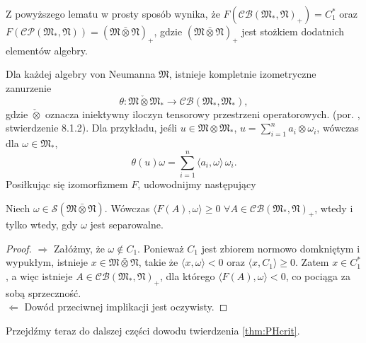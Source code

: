 Z powyższego lematu w prosty sposób wynika, że
$F(\mathcal{CB}(\mathfrak{M}_{*}, \mathfrak{N})_{+}) = C_{1}^{*}$ oraz
$F(\mathcal{CP}(\mathfrak{M}_{*}, \mathfrak{N})) = (\mathfrak{M} \bar{\otimes} \mathfrak{N})_{+}$,
gdzie $(\mathfrak{M} \bar{\otimes} \mathfrak{N})_{+}$
jest stożkiem dodatnich elementów algebry.

Dla każdej algebry von Neumanna $\mathfrak{M}$,
istnieje kompletnie izometryczne zanurzenie
\begin{equation}
\theta: \mathfrak{M} \check{\otimes} \mathfrak{M}_{*}\rightarrow
\mathcal{CB}(\mathfrak{M}_{*}, \mathfrak{M}_{*}),
\end{equation}
gdzie $\check{\otimes}$ oznacza iniektywny iloczyn tensorowy przestrzeni operatorowych.
(por. \cite{Effros2000}, stwierdzenie 8.1.2).
Dla przykładu, jeśli
$u \in \mathfrak{M} \otimes \mathfrak{M}_{*}$, $u = \sum_{i = 1}^{n} a_{i} \otimes \omega_{i}$,
wówczas dla $\omega \in \mathfrak{M}_{*}$,
\begin{equation}
\theta(u)\omega = \sum_{i=1}^{n} \langle a_{i} , \omega \rangle \, \omega_{i}.
\end{equation}
Posiłkując się izomorfizmem $F$,
udowodnijmy następujący
\begin{Lemma}
\label{prop:34523}
Niech $\omega\in \mathcal{S}(\mathfrak{M} \bar{\otimes} \mathfrak{N})$.
Wówczas $\langle F(A),\omega\rangle\geq 0$ $\forall A\in
\mathcal{CB}(\mathfrak{M}_*,\mathfrak{N})_+$,
wtedy i tylko wtedy, gdy $\omega$ jest separowalne.
\end{Lemma}
\begin{proof}
$\Rightarrow$ Załóżmy, że $\omega\notin C_1$.
Ponieważ $C_1$ jest zbiorem normowo domkniętym i wypukłym,
istnieje $x \in \mathfrak{M} \bar{\otimes} \mathfrak{N}$,
takie że $\langle x, \omega\rangle<0$ oraz $\langle x,C_1\rangle\geq 0$.
Zatem $x\in C_1^*$, a więc istnieje $A \in \mathcal{CB}(\mathfrak{M}_*,\mathfrak{N})_+$,
dla którego $\langle F(A),\omega\rangle<0$, co pociąga za sobą sprzeczność.\\
$\Leftarrow$ Dowód przeciwnej implikacji jest oczywisty.
\end{proof}

Przejdźmy teraz do dalszej części dowodu twierdzenia \ref{thm:PHcrit}.

